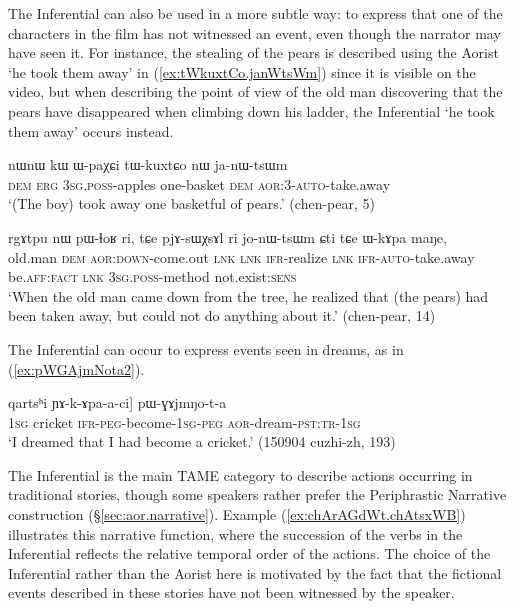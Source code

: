 The Inferential can also be used in a more subtle way: to express that one of the characters in the film has not witnessed an event, even though the narrator may have seen it. For instance, the stealing of the pears is described using the Aorist  `he took them away' in (\ref{ex:tWkuxtCo.janWtsWm}) since it is visible on the video, but when describing the point of view of the old man discovering that the pears have disappeared when climbing down his ladder, the Inferential  `he took them away' occurs instead.

\begin{exe}
\ex \label{ex:tWkuxtCo.janWtsWm}
\gll nɯnɯ kɯ ɯ-paχɕi tɯ-kuxtɕo nɯ ja-nɯ-tsɯm \\
\textsc{dem} \textsc{erg} \textsc{3sg}.\textsc{poss}-apples one-basket \textsc{dem} \textsc{aor}:3\flobv{}-\textsc{auto}-take.away \\
\glt `(The boy) took away one basketful of pears.' (chen-pear, 5)
 \end{exe}
 
\begin{exe}
\ex \label{ex:jonWtsWm.Cti}
\gll rgɤtpu nɯ pɯ-ɬoʁ ri, tɕe pjɤ-sɯχsɤl ri jo-nɯ-tsɯm ɕti tɕe ɯ-kɤpa maŋe,  \\
old.man \textsc{dem} \textsc{aor}:\textsc{down}-come.out \textsc{lnk} \textsc{lnk} \textsc{ifr}-realize \textsc{lnk} \textsc{ifr}-\textsc{auto}-take.away be.\textsc{aff}:\textsc{fact} \textsc{lnk} \textsc{3sg}.\textsc{poss}-method not.exist:\textsc{sens} \\
\glt `When the old man came down from the tree, he realized that (the pears) had been taken away, but could not do anything about it.' (chen-pear, 14)
 \end{exe}

The Inferential can occur to express events seen in dreams, as in (\ref{ex:pWGAjmNota2}).

\begin{exe}
\ex \label{ex:pWGAjmNota2}
 \gll [aʑo [...] qartsʰi ɲɤ-k-ɤpa-a-ci] pɯ-ɣɤjmŋo-t-a \\
\textsc{1sg} {  } cricket \textsc{ifr}-\textsc{peg}-become-\textsc{1sg}-\textsc{peg} \textsc{aor}-dream-\textsc{pst}:\textsc{tr}-\textsc{1sg} \\
\glt `I dreamed that I had become a cricket.' (150904 cuzhi-zh, 193)
\end{exe}

The Inferential is the main TAME category to describe actions occurring in traditional stories, though some speakers rather prefer the Periphrastic Narrative construction (§\ref{sec:aor.narrative}). Example (\ref{ex:chArAGdWt.chAtsxWB}) illustrates this narrative function, where the succession of the verbs in the Inferential reflects the relative temporal order of the actions. The choice of the Inferential rather than the Aorist here is motivated by the fact that the fictional events described in these stories have not been witnessed by the speaker. 


